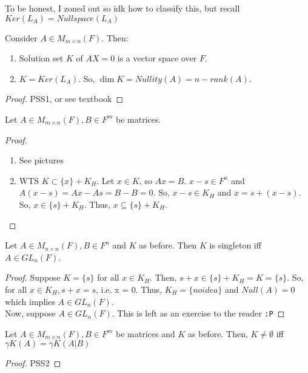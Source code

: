 \documentclass[12pt, letterpaper]{article}
\begin{document}
  \begin{remark}
    To be honest, I zoned out so idk how to classify this, but recall $Ker(L_A) = Nullspace(L_A)$
  \end{remark}
  \begin{theorem}
    Consider $A \in M_{m \times n}(F)$.
    Then:
    \begin{enumerate}
      \item Solution set $K$ of $AX = 0$ is a vector space over $F$.
      \item $K = Ker(L_A)$.
        So, $\dim{K} = Nullity(A) = n - rank(A)$.
    \end{enumerate}
    \begin{proof}
      PSS1, or see textbook
    \end{proof}
  \end{theorem}
  \begin{theorem}
    Let $A \in M_{m \times n}(F), B\in F^m$ be matrices.
    
    \begin{proof}
      \item
      \begin{enumerate}
        \item See pictures
        \item WTS $K \subset \{x\} + K_H$.
          Let $x\in K$, so $Ax = B$.
          $x-s \in F^n$ and $A(x-s) = Ax - As = B-B = 0$.
          So, $x-s \in K_H$ and $x= s+(x-s)$.
          So, $x \in \{s\} + K_H$.
          Thus, $x \subseteq \{s\} + K_H$.
      \end{enumerate}
    \end{proof}
  \end{theorem}
  \begin{theorem}
    Let $A \in M_{n\times n}(F), B\in F^n$ and $K$ as before. 
    Then $K$ is singleton iff $A \in GL_n(F)$.
    \begin{proof}
      Suppose $K = \{s\}$ for all $x \in K_H$.
      Then, $s + x \in \{s\} + K_H = K = \{s\}$.
      So, for all $x \in K_H, s+x = s$, i.e. x = 0.
      Thus, $K_H = \{no idea\}$ and $Null(A) = 0$ which implies $A \in GL_n(F)$.
      \\
      Now, suppose $A \in GL_n(F)$. This is left as an exercise to the reader \texttt{:P}
    \end{proof}
  \end{theorem}
  \begin{theorem}[Insel 3.11]
    Let $A \in M_{m\times n}(F), B \in F^m$ be matrices and $K$ as before.
    Then, $K \neq \emptyset$ iff $\gamma K(A) = \gamma K(A|B)$
    \begin{proof}
      PSS2
    \end{proof}
  \end{theorem}
\end{document}
